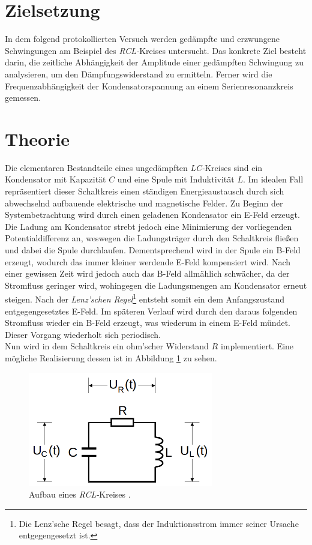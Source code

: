 %

%
\section{Zielsetzung}

In dem folgend protokollierten Versuch werden gedämpfte und erzwungene Schwingungen am Beispiel des \emph{RCL-}Kreises
untersucht. Das konkrete Ziel besteht darin, die zeitliche Abhängigkeit der Amplitude einer gedämpften Schwingung zu
analysieren, um den Dämpfungswiderstand zu ermitteln. Ferner wird die Frequenzabhängigkeit der Kondensatorspannung an einem
Serienresonanzkreis gemessen.

\section{Theorie}
\label{sec:Theorie}

Die elementaren Bestandteile eines ungedämpften \emph{LC-}Kreises sind ein Kondensator mit Kapazität $C$ und eine 
Spule mit Induktivität $L$. Im idealen Fall repräsentiert dieser Schaltkreis einen ständigen Energieaustausch durch 
sich abwechselnd aufbauende elektrische und magnetische Felder. Zu Beginn der Systembetrachtung wird durch einen 
geladenen Kondensator ein E-Feld erzeugt. Die Ladung am Kondensator strebt jedoch eine Minimierung der vorliegenden 
Potentialdifferenz an, weswegen die Ladungsträger durch den Schaltkreis fließen und dabei die Spule durchlaufen. 
Dementsprechend wird in der Spule ein B-Feld erzeugt, wodurch das immer kleiner werdende E-Feld kompensiert wird. Nach
einer gewissen Zeit wird jedoch auch das B-Feld allmählich schwächer, da der Stromfluss geringer wird, wohingegen die 
Ladungsmengen am Kondensator erneut steigen. Nach der \emph{Lenz'schen Regel}\footnote{Die Lenz'sche Regel besagt, dass der
Induktionsstrom immer seiner Ursache entgegengesetzt ist.} entsteht somit ein dem Anfangszustand entgegengesetztes E-Feld.
Im späteren Verlauf wird durch den daraus folgenden Stromfluss wieder ein B-Feld erzeugt, was wiederum in einem E-Feld 
mündet. Dieser Vorgang wiederholt sich periodisch.\\
Nun wird in dem Schaltkreis ein ohm'scher Widerstand $R$ implementiert. Eine mögliche Realisierung dessen ist in Abbildung 
\ref{fig:RCL-Kreis} zu sehen.

\begin{figure}
    \centering
    \includegraphics[height=5cm]{./content/RCL_Kreis.png}
    \caption{Aufbau eines \emph{RCL-}Kreises \cite{Versuchsanleitung_v354}.}
    \label{fig:RCL-Kreis}
\end{figure}

